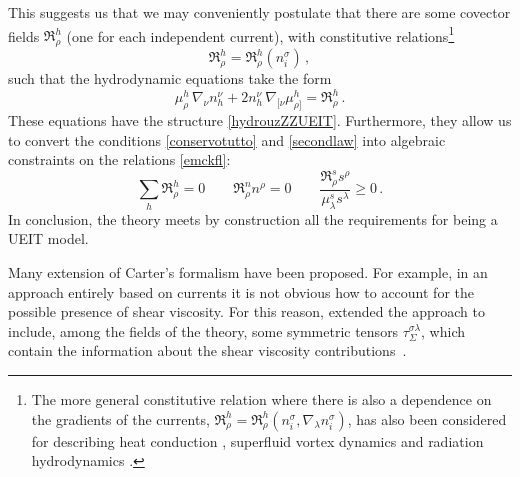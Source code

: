 \documentclass[a4paper, amsfonts, amssymb, amsmath, reprint, twocolumn, showkeys, nofootinbib]{revtex4-2}
\begin{document}
This suggests us that we may conveniently postulate that there are some covector fields $\mathfrak{R}^h_\rho$ (one for each independent current), with constitutive relations\footnote{
The more general constitutive relation  where there is also a dependence on the gradients of the currents, $\mathfrak{R}^h_\rho = \mathfrak{R}^h_\rho (n_i^\sigma,\nabla_\lambda n_i^\sigma)$, has also been considered for describing heat conduction \citep{Lopez09}, superfluid vortex dynamics \cite{langlois98,RauWasserman2020,GavassinoIordanskii2021} and radiation hydrodynamics \citep{GavassinoRadiazione}. }
\begin{equation}\label{emckfl}
\mathfrak{R}^h_\rho = \mathfrak{R}^h_\rho (n_i^\sigma) \, ,
\end{equation}
such that the hydrodynamic equations take the form
\begin{equation}\label{hydrunkz}
\mu^h_\rho \, \nabla_\nu n_h^\nu + 2n_h^\nu \, \nabla_{ [ \nu} \mu_{\rho ]}^h = \mathfrak{R}^h_\rho  \, . 
\end{equation}
These equations have the structure \eqref{hydrouzZZUEIT}. Furthermore, they allow us to convert the conditions \eqref{conservotutto} and \eqref{secondlaw} into algebraic constraints on the relations \eqref{emckfl}:
\begin{equation}
\sum_h \mathfrak{R}^h_\rho =0  \quad \quad  \mathfrak{R}^n_\rho n^\rho = 0 \quad \quad  \dfrac{\mathfrak{R}^s_\rho s^\rho}{\mu^s_\lambda s^\lambda} \geq 0 \, .
\end{equation} 
In conclusion, the theory meets by construction all the requirements for being a UEIT model.
 
Many extension of Carter's formalism have been proposed. For example, in an approach entirely based on currents it is not obvious how to account for the possible presence of shear viscosity. For this reason, \citet{carter1991} extended the approach to include, among the fields of the theory, some symmetric tensors $\tau_\Sigma^{\sigma \lambda}$, which contain the information about the shear viscosity contributions~\citep{PriouCOMPAR1991}. 
\end{document}
